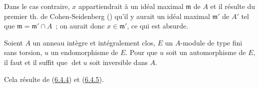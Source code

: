 Dans le cas contraire, $x$ appartiendrait à un idéal maximal $\mathfrak{m}$
de $A$ et il résulte du premier th. de Cohen-Seidenberg
(\cite[t.~I, p.~257, th.~3]{I-13}) qu'il y aurait un idéal maximal
$\mathfrak{m}'$ de $A'$ tel que $\mathfrak{m}=\mathfrak{m}'\cap A$~; on aurait
donc $x\in\mathfrak{m}'$, ce qui est absurde.

\begin{corollary}[6.4.6]
\label{II.6.4.6-fr}
Soient $A$ un anneau intègre et intégralement clos, $E$ un $A$-module de type
fini sans torsion, $u$ un endomorphisme de $E$. Pour que $u$ soit un
automorphisme de $E$, il faut et il suffit que $\det u$ soit inversible dans
$A$.
\end{corollary}

Cela résulte de (\hyperref[II.6.4.4-fr]{6.4.4}) et
(\hyperref[II.6.4.5-fr]{6.4.5}).

